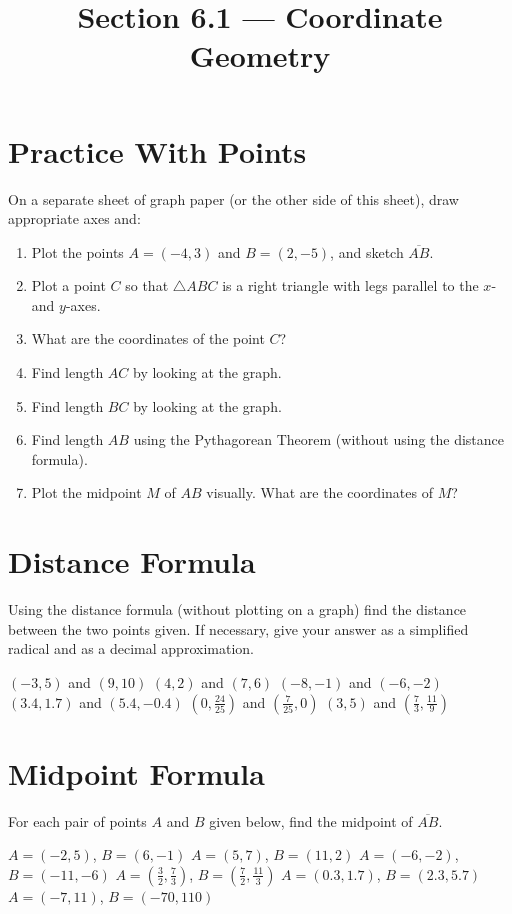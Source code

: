 

\title{Section 6.1 --- Coordinate Geometry}


\maketitle

\section*{Practice With Points}
\begin{senum}
\item On a separate sheet of graph paper (or the other side of this sheet), draw appropriate axes and:
\begin{enumerate}
\item Plot the points $A=(-4,3)$ and $B=(2,-5)$, and sketch $\overline{AB}$.
\item Plot a point $C$ so that $\triangle ABC$ is a right triangle with legs parallel to the $x$- and $y$-axes.
\item What are the coordinates of the point $C$?
\item Find length $AC$ by looking at the graph.
\item Find length $BC$ by looking at the graph.
\item Find length $AB$ using the Pythagorean Theorem (without using the distance formula).
\item Plot the midpoint $M$ of $AB$ visually. What are the coordinates of $M$?
\end{enumerate}
\end{senum}

\section*{Distance Formula}
Using the distance formula (without plotting on a graph) find the distance between the two points given. If necessary, give your answer as a simplified radical and as a decimal approximation.
\begin{smenum}
\mitemxxx
{$(-3,5)$ and $(9,10)$}
{$(4,2)$ and $(7,6)$}
{$(-8,-1)$ and $(-6,-2)$}
\mitemxxx
{$(3.4,1.7)$ and $(5.4,-0.4)$}
{$\left(0,\frac{24}{25}\right)$ and $\left(\frac{7}{25},0\right)$}
{$(3,5)$ and $\left(\frac{7}{3},\frac{11}{9}\right)$}
\end{smenum}

\section*{Midpoint Formula}
For each pair of points $A$ and $B$ given below, find the midpoint of $\overline{AB}$.
\begin{smenum}
\mitemxxx
{$A=(-2,5)$, $B=(6,-1)$}
{$A=(5,7)$, $B=(11,2)$}
{$A=(-6,-2)$, $B=(-11,-6)$}
\mitemxxx
{$A=\left(\frac{3}{2},\frac{7}{3}\right)$, $B=\left(\frac{7}{2},\frac{11}{3}\right)$}
{$A=(0.3,1.7)$, $B=(2.3,5.7)$}
{$A=(-7,11)$, $B=(-70,110)$}
\end{smenum}

